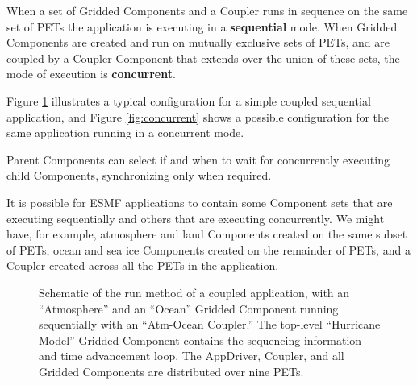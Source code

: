 When a set of Gridded Components and a Coupler runs in sequence
on the same set of PETs the application is executing in a {\bf sequential}
mode. When Gridded Components are created and run on mutually exclusive
sets of PETs, and are coupled by a Coupler Component that extends over
the union of these sets, the mode of execution is {\bf concurrent}.

Figure \ref{fig:serial} illustrates a typical configuration for 
a simple coupled sequential
application, and Figure \ref{fig:concurrent} shows a possible 
configuration for the same application running in a concurrent mode.

Parent Components can select if and when to wait for concurrently
executing child Components, synchronizing only when required.

It is possible for ESMF applications to contain some Component sets
that are executing sequentially and others that are executing concurrently.
We might have, for example, atmosphere and land Components created
on the same subset of PETs, ocean and sea ice Components created on
the remainder of PETs, and a Coupler created across all the PETs in
the application.

\begin{center}
\begin{figure}
\caption{Schematic of the run method of a coupled application, with an
``Atmosphere'' and an ``Ocean'' Gridded Component running sequentially with 
an ``Atm-Ocean Coupler.''  The top-level ``Hurricane Model'' 
Gridded Component contains the sequencing information and time 
advancement loop.  The AppDriver, Coupler, and all Gridded Components 
are distributed over nine PETs.}
\label{fig:serial}
\end{figure}
\end{center}

